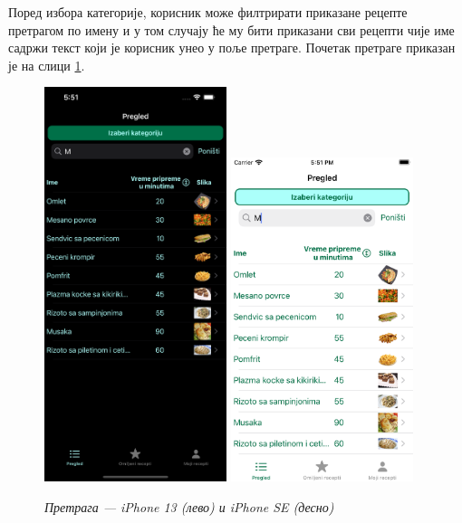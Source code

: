\documentclass[12pt,oneside]{memoir}
\begin{document}
\indent Поред избора категорије, корисник може филтрирати приказане рецепте претрагом по имену и у том случају ће му бити приказани сви рецепти чије име садржи текст који је корисник унео у поље претраге. Почетак претраге приказан је на слици \ref{slika:претрага_1}.

\begin{figure} [H]
    \centering
    \captionsetup{justification=centering}
    \includegraphics[width=0.475\textwidth]{images/simulators/view images/dark - search.png} 
    \hfill
    \includegraphics[width=0.475\textwidth]{images/simulators/view images/light - search.png} 
    \caption{\textit{Претрага --- iPhone 13 (лево) и iPhone SE (десно)}}
    \label{slika:претрага_1}
\end{figure}
\end{document}
